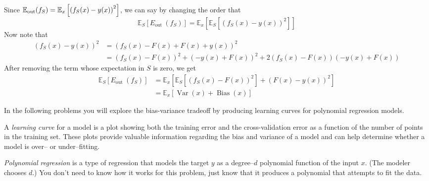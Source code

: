 \documentclass{article}
\begin{document}
\begin{solution}
Since $\mathbb{E}_{\text{out}}(f_{S}) = \mathbb{E}_x\left[\left(f_S(x) - y(x)\right)^2\right]$, we can say by changing the order that
\begin{equation*}
    \mathbb{E}_S\left[E_{\text {out }}\left(f_S\right)\right] = \mathbb{E}_x\left[\mathbb{E}_S\left[\left(f_S(x)-y(x)\right)^2\right]\right]
\end{equation*}
Now note that 
\begin{align*}
    (f_{S}(x) - y(x))^2 &= (f_{S}(x) - F(x) + F(x) + y(x))^2 \\
    &= (f_{S}(x)-F(x))^2 + (-y(x) + F(x))^2 + 2(f_{S}(x)-F(x))(-y(x) + F(x))
\end{align*}
After removing the term whose expectation in $S$ is zero, we get
  \begin{equation*}
\begin{aligned}
\mathbb{E}_S\left[E_{\text {out }}\left(f_S\right)\right] 
& =\mathbb{E}_x\left[\mathbb{E}_S\left[\left(f_S(x)-F(x)\right)^2\right]+(F(x)-y(x))^2\right] \\
& =\mathbb{E}_x[\operatorname{Var}(x)+\operatorname{Bias}(x)]
\end{aligned}
\end{equation*}
\end{solution}

In the following problems you will explore the bias-variance tradeoff by producing learning curves for polynomial regression models.

A \emph{learning curve} for a model is a plot showing both the training error and the cross-validation error as a function of the number of points in the training set. These plots provide valuable information regarding the bias and variance of a model and can help determine whether a model is over-- or under--fitting.

\emph{Polynomial regression} is a type of regression that models the target $y$ as a degree--$d$ polynomial function of the input $x$. (The modeler chooses $d$.)  You don't need to know how it works for this problem, just know that it produces a polynomial that attempts to fit the data.
\end{document}
